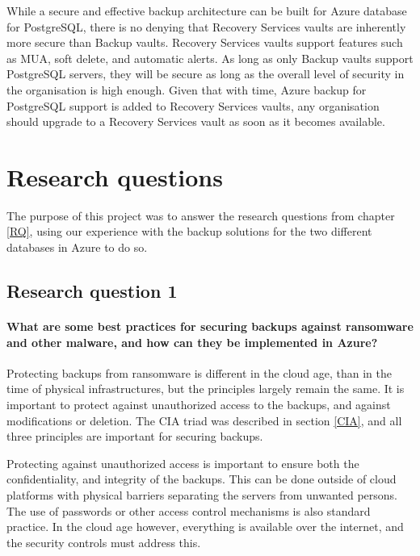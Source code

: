 While a secure and effective backup architecture can be built for Azure database for PostgreSQL, there is no denying that Recovery Services vaults are inherently more secure than Backup vaults. Recovery Services vaults support features such as MUA, soft delete, and automatic alerts.  As long as only Backup vaults support PostgreSQL servers, they will be secure as long as the overall level of security in the organisation is high enough. Given that with time, Azure backup for PostgreSQL support is added to Recovery Services vaults, any organisation should upgrade to a Recovery Services vault as soon as it becomes available. 

\section{Research questions}
The purpose of this project was to answer the research questions from chapter \ref{RQ}, using our experience with the backup solutions for the two different databases in Azure to do so. 

\subsection{Research question 1}
\paragraph{What are some best practices for securing backups against ransomware and other malware, and how can they be implemented in Azure?}

Protecting backups from ransomware is different in the cloud age, than in the time of physical infrastructures, but the principles largely remain the same. It is important to protect against unauthorized access to the backups, and against modifications or deletion. The CIA triad was described in section \ref{CIA}, and all three principles are important for securing backups.

Protecting against unauthorized access is important to ensure both the confidentiality, and integrity of the backups. This can be done outside of cloud platforms with physical barriers separating the servers from unwanted persons. The use of passwords or other access control mechanisms is also standard practice. In the cloud age however, everything is available over the internet, and the security controls must address this. 


